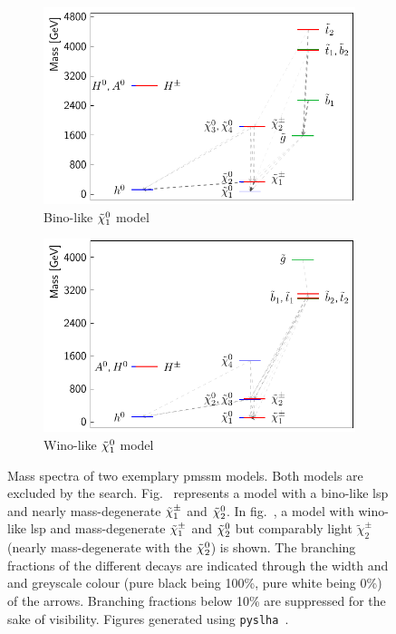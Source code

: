 \begin{figure}
	\centering
	\begin{subfigure}[b]{0.49\linewidth}
		\centering\includegraphics[width=\textwidth]{thesis_plot_9127}
		\caption{Bino-like $\tilde{\chi}_1^0$ model\label{fig:slha_1}}
	\end{subfigure}\hfill
	\begin{subfigure}[b]{0.49\linewidth}
		\centering\includegraphics[width=\textwidth]{thesis_plot_1655}
		\caption{Wino-like $\tilde{\chi}_1^0$ model\label{fig:slha_2}}
	\end{subfigure}\hfill
	\caption{Mass spectra of two exemplary \gls{pmssm} models. Both models are excluded by the \onelepton search. Fig.~ represents a model with a bino-like \gls{lsp} and nearly mass-degenerate $\tilde{\chi}_1^\pm$ and $\tilde{\chi}_2^0$. In fig.~, a model with wino-like \gls{lsp} and mass-degenerate $\tilde{\chi}_1^\pm$ and $\tilde{\chi}_2^0$ but comparably light $\tilde{\chi}_2^\pm$ (nearly mass-degenerate with the $\tilde{\chi}_2^0$) is shown. The branching fractions of the different decays are indicated through the width and and greyscale colour (pure black being 100\%, pure white being 0\%) of the arrows. Branching fractions below 10\% are suppressed for the sake of visibility. Figures generated using \texttt{pyslha}~\cite{pyslha:2013jua}.}
	\label{fig:slha}
\end{figure}

